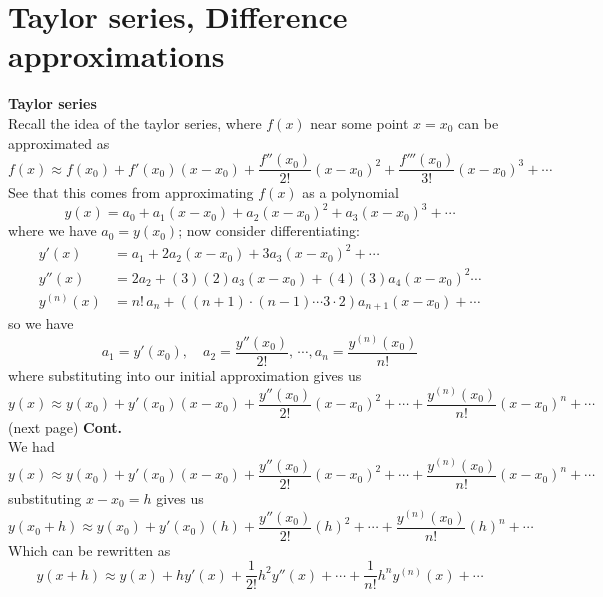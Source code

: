 \documentclass{report}
\begin{document}
\section{Taylor series, Difference approximations}
\textbf{Taylor series}\\
Recall the idea of the taylor series, where $f(x)$ near some point $x=x_0$ can be approximated as
\begin{equation*}
f(x)\approx f(x_0)+f'(x_0)(x-x_0)+\frac{f''(x_0)}{2!}(x-x_0)^2+\frac{f'''(x_0)}{3!}(x-x_0)^3+\cdots
\end{equation*}
See that this comes from approximating $f(x)$ as a polynomial
\begin{equation*}
y(x)=a_0+a_1(x-x_0)+a_2(x-x_0)^2+a_3(x-x_0)^3+\cdots
\end{equation*}
where we have $a_0=y(x_0)$; now consider differentiating:
\begin{align*}
y'(x)&=a_1+2a_2(x-x_0)+3a_3(x-x_0)^2+\cdots\\
y''(x)&=2a_2+(3)(2)a_3(x-x_0)+(4)(3)a_4(x-x_0)^2\cdots\\
y^{(n)}(x)&=n!\,a_n+((n+1)\cdot(n-1)\cdots3\cdot2)a_{n+1}(x-x_0)+\cdots
\end{align*}
so we have
\begin{equation*}
a_1=y'(x_0),\quad a_2=\frac{y''(x_0)}{2!},\,\cdots,a_n=\frac{y^{(n)}(x_0)}{n!}
\end{equation*}
where substituting into our initial approximation gives us
\begin{equation*}
y(x)\approx y(x_0)+y'(x_0)(x-x_0)+\frac{y''(x_0)}{2!}(x-x_0)^2+\cdots+\frac{y^{(n)}(x_0)}{n!}(x-x_0)^n+\cdots
\end{equation*}
(next page)\newpage
\noindent\textbf{Cont.}\\
We had
\begin{equation*}
y(x)\approx y(x_0)+y'(x_0)(x-x_0)+\frac{y''(x_0)}{2!}(x-x_0)^2+\cdots+\frac{y^{(n)}(x_0)}{n!}(x-x_0)^n+\cdots
\end{equation*}
substituting $x-x_0=h$ gives us
\begin{equation*}
y(x_0+h)\approx y(x_0)+y'(x_0)(h)+\frac{y''(x_0)}{2!}(h)^2+\cdots+\frac{y^{(n)}(x_0)}{n!}(h)^n+\cdots
\end{equation*}
Which can be rewritten as
\begin{equation*}
y(x+h)\approx y(x)+hy'(x)+\frac{1}{2!}h^2y''(x)+\cdots+\frac{1}{n!}h^ny^{(n)}(x)+\cdots
\end{equation*}
\vspace{1mm}\\
\end{document}
